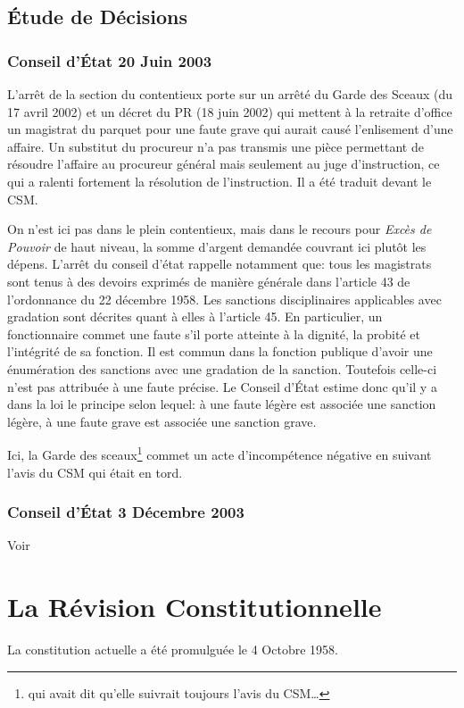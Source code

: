 \documentclass[math]{cours}
\begin{document}
\subsection{Étude de Décisions}
\subsubsection{Conseil d'État 20 Juin 2003}
L'arrêt \cite{CE20062003} de la section du contentieux porte sur un arrêté du Garde des Sceaux (du 17 avril 2002) et un décret du PR (18 juin 2002) qui mettent à la retraite d'office un magistrat du parquet pour une faute grave qui aurait causé l'enlisement d'une affaire.
Un substitut du procureur n'a pas transmis une pièce permettant de résoudre l'affaire au procureur général mais seulement au juge d'instruction, ce qui a ralenti fortement la résolution de l'instruction.
Il a été traduit devant le CSM.

On n'est ici pas dans le plein contentieux, mais dans le recours pour \emph{Excès de Pouvoir} de haut niveau, la somme d'argent demandée couvrant ici plutôt les dépens.
L'arrêt du conseil d'état rappelle notamment que: tous les magistrats sont tenus à des devoirs exprimés de manière générale dans l'article 43 de l'ordonnance du 22 décembre 1958.
Les sanctions disciplinaires applicables avec gradation sont décrites quant à elles à l'article 45.
En particulier, un fonctionnaire commet une faute s'il porte atteinte à la dignité, la probité et l'intégrité de sa fonction.
Il est commun dans la fonction publique d'avoir une énumération des sanctions avec une gradation de la sanction. Toutefois celle-ci n'est pas attribuée à une faute précise.
Le Conseil d'État estime donc qu'il y a dans la loi le principe selon lequel: à une faute légère est associée une sanction légère, à une faute grave est associée une sanction grave.

Ici, la Garde des sceaux\footnote{qui avait dit qu'elle suivrait toujours l'avis du CSM\ldots} commet un acte d'incompétence négative en suivant l'avis du CSM qui était en tord.

\subsubsection{Conseil d'État 3 Décembre 2003}
Voir \cite{CE03122003}

\section{La Révision Constitutionnelle}
La constitution actuelle a été promulguée le 4 Octobre 1958.
\end{document}
